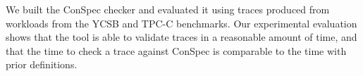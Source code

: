 \documentclass[journal, compsoc]{IEEEtran}
\begin{document}
	
	We built the ConSpec checker and evaluated it using traces produced from workloads from the YCSB and TPC-C benchmarks. Our experimental evaluation shows that the tool is able to validate traces in a reasonable amount of time, and that the time to check a trace against ConSpec is comparable to the time with prior definitions.
	
\end{document}
